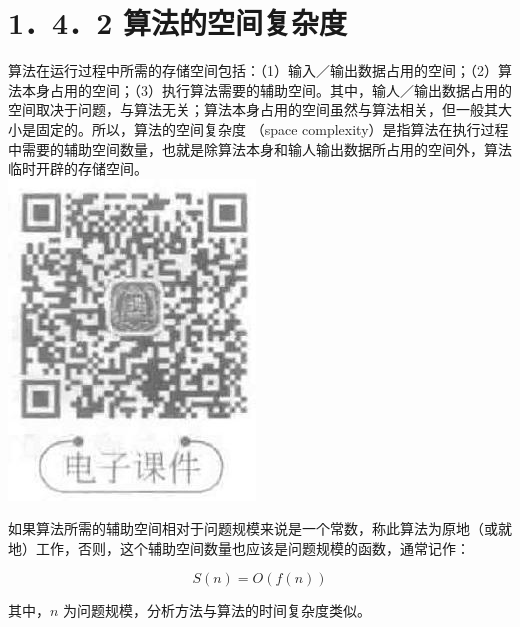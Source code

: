\documentclass[10pt]{article}
\begin{document}
\section*{1．4．2 算法的空间复杂度}
算法在运行过程中所需的存储空间包括：（1）输入／输出数据占用的空间；（2）算法本身占用的空间；（3）执行算法需要的辅助空间。其中，输人／输出数据占用的空间取决于问题，与算法无关；算法本身占用的空间虽然与算法相关，但一般其大小是固定的。所以，算法的空间复杂度 （space complexity）是指算法在执行过程中需要的辅助空间数量，也就是除算法本身和输人输出数据所占用的空间外，算法临时开辟的存储空间。\\
\includegraphics[max width=\textwidth, center]{2025_06_06_704745ea57b15b2333e5g-031}

如果算法所需的辅助空间相对于问题规模来说是一个常数，称此算法为原地（或就地）工作，否则，这个辅助空间数量也应该是问题规模的函数，通常记作：

$$
S(n)=O(f(n))
$$

其中，$n$ 为问题规模，分析方法与算法的时间复杂度类似。
\end{document}

